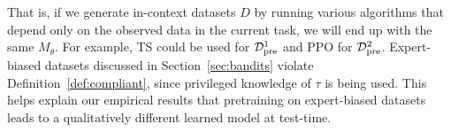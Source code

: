 That is, if we generate in-context datasets $D$ by running various algorithms that depend only on the observed data in the current task, we will end up with the same $M_{\theta}$. For example, TS could be used for $\mathcal{D}_{\text{pre}}^1$ and PPO for $\mathcal{D}_{\text{pre}}^2$. Expert-biased datasets discussed in Section~\ref{sec:bandits} violate Definition~\ref{def:compliant}, since privileged knowledge of $\tau$ is being used. This helps explain our empirical results that pretraining on expert-biased datasets leads to a qualitatively different learned model at test-time.